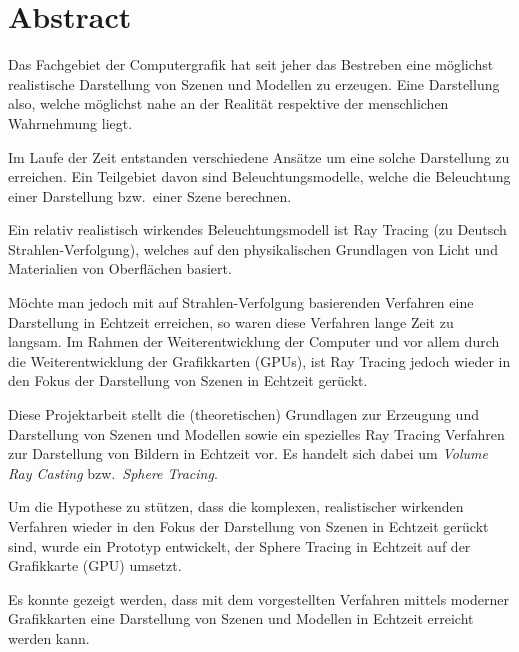 
\chapter*{Abstract}
\label{chap:abstract}

Das Fachgebiet der Computergrafik hat seit jeher das Bestreben eine
möglichst realistische Darstellung von Szenen und Modellen zu erzeugen.
Eine Darstellung also, welche möglichst nahe an der Realität respektive
der menschlichen Wahrnehmung liegt.

Im Laufe der Zeit entstanden verschiedene Ansätze um eine solche
Darstellung zu erreichen. Ein Teilgebiet davon sind Beleuchtungsmodelle,
welche die Beleuchtung einer Darstellung bzw.~einer Szene berechnen.

Ein relativ realistisch wirkendes Beleuchtungsmodell ist Ray Tracing (zu
Deutsch Strahlen-Verfolgung), welches auf den physikalischen Grundlagen
von Licht und Materialien von Oberflächen basiert.

Möchte man jedoch mit auf Strahlen-Verfolgung basierenden Verfahren eine
Darstellung in Echtzeit erreichen, so waren diese Verfahren lange Zeit
zu langsam. Im Rahmen der Weiterentwicklung der Computer und vor allem
durch die Weiterentwicklung der Grafikkarten (GPUs), ist Ray Tracing
jedoch wieder in den Fokus der Darstellung von Szenen in Echtzeit
gerückt.

Diese Projektarbeit stellt die (theoretischen) Grundlagen zur Erzeugung
und Darstellung von Szenen und Modellen sowie ein spezielles Ray Tracing
Verfahren zur Darstellung von Bildern in Echtzeit vor. Es handelt sich
dabei um \textit{Volume Ray Casting} bzw.~\textit{Sphere Tracing}.

Um die Hypothese zu stützen, dass die komplexen, realistischer wirkenden
Verfahren wieder in den Fokus der Darstellung von Szenen in Echtzeit
gerückt sind, wurde ein Prototyp entwickelt, der Sphere Tracing in
Echtzeit auf der Grafikkarte (GPU) umsetzt.

Es konnte gezeigt werden, dass mit dem vorgestellten Verfahren mittels
moderner Grafikkarten eine Darstellung von Szenen und Modellen in
Echtzeit erreicht werden kann.
